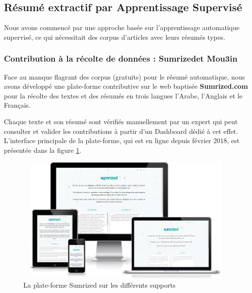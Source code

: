 \subsection{Résumé extractif par Apprentissage Supervisé}
Nous avons commencé par une approche basée sur l'apprentissage automatique supervisé, ce qui nécessitait des corpus d'articles avec leurs résumés types.

    \subsubsection{Contribution à la récolte de données : \textquotedbl Sumrized\textquotedbl et \textquotedbl Mou3in\textquotedbl}
    Face au manque flagrant des corpus (gratuits) pour le résumé automatique, nous avons développé une plate-forme contributive sur le web baptisée \textbf{Sumrized.com} pour la récolte des textes et des résumés en trois langues l'Arabe, l'Anglais et le Français.
    
    Chaque texte et son résumé sont vérifiés manuellement par un expert qui peut consulter et valider les contributions à partir d'un Dashboard dédié à cet effet. L'interface principale de la plate-forme, qui est en ligne depuis février 2018, est présentée dans la figure \ref{sumrized-ui}. 
    
    \begin{figure}[H]
        \centering
        \includegraphics[height=180pt,width=320pt]{img/chapter4/sumrized/responsive.png}
        \caption{La plate-forme Sumrized sur les différents supports}
        \label{sumrized-ui}
    \end{figure} 
    
